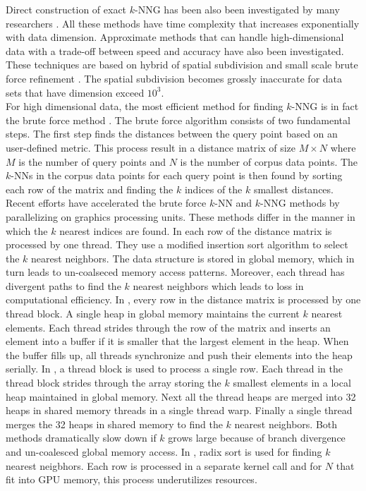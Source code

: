 \documentclass[10pt]{article}
\begin{document}
Direct construction of exact $k$-NNG has been also been investigated by many researchers \cite{Bentley:1980, Clarkson:1983,Vaidya:1989,ParedesCFN:2006,Chan:1998,ConnorK:2010}. All these methods have time complexity that increases exponentially with data dimension.  Approximate methods that can handle high-dimensional data with a trade-off between speed and accuracy have also been investigated. These techniques are based on hybrid of spatial subdivision and small scale brute force refinement  \cite{ChenFS:2009,Wang:2012, DongCL:2011}.  The spatial subdivision becomes grossly inaccurate for data sets that have dimension exceed $10^3$.\\

For high dimensional data, the most efficient method for finding $k$-NNG is in fact the brute force method \cite{Indyk:2004}. The brute force algorithm consists of two fundamental steps. The first step finds the distances between the query point based on an user-defined metric. This process result in a distance matrix of size $M \times N$ where $M$ is the number of query points and $N$ is the number of corpus data points. The $k$-NNs in the corpus data points for each query point is then found by sorting each row of the matrix and finding the $k$ indices of the $k$ smallest distances. Recent efforts have accelerated the brute force $k$-NN and $k$-NNG methods by parallelizing on graphics processing units. These methods differ in the manner in which the $k$ nearest indices are found. In \cite{Garcia2010, Arefin2012} each row of the distance matrix is processed by one thread. They use a modified insertion sort algorithm to select the $k$ nearest neighbors. The data structure is stored in global memory, which in turn leads to un-coalseced memory access patterns. Moreover, each thread has divergent paths to find the $k$ nearest neighbors which leads to loss in computational efficiency. In \cite{Barrientos2011}, every row in the distance matrix is processed by one thread block. A single heap in global memory maintains the current $k$ nearest elements. Each thread strides through the row of the matrix and inserts an element into a buffer if it is smaller that the largest element in the heap. When the buffer fills up, all threads synchronize and push their elements into the heap serially.   In \cite{Kato2009}, a thread block is used to process a single row. Each thread in the thread block strides through the array storing the $k$ smallest elements in a local heap maintained in global memory. Next all the thread heaps are merged into 32 heaps in shared memory threads in a single thread warp. Finally a single thread merges the 32 heaps in shared memory to find the $k$ nearest neighbors. Both methods dramatically slow down if $k$ grows large because of branch divergence and un-coalesced global memory access. In \cite{Kuang:2009}, radix sort is used for finding $k$ nearest neigbhors. Each row is processed in a separate kernel call and for $N$ that fit into GPU memory, this process underutilizes resources.\\
\end{document}
